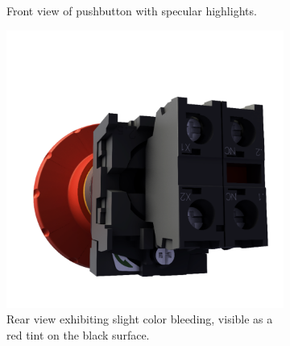 \begin{figure}[H]
\begin{subfigure}[t]{0.38\textwidth}
        \caption{Front view of pushbutton with specular highlights.}
        \label{fig:demo-specular}
    \end{subfigure}
    \hspace*{1cm}
    \vfill
    \vspace*{0.5cm}
    \hspace*{1cm}
    \begin{subfigure}[t]{0.38\textwidth}
        \includegraphics[width=\textwidth]{resources/demo-color-bleeding.png}
        \caption{Rear view exhibiting slight color bleeding, visible as a red tint on the black surface.}
        \label{fig:demo-color-bleeding}
    \end{subfigure}
    \hfill
    \begin{subfigure}[t]{0.38\textwidth}

\end{subfigure}
\end{figure}

